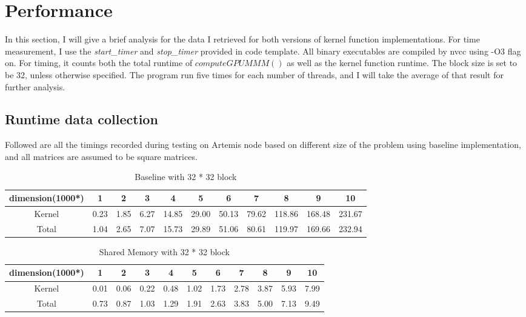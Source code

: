 \documentclass{cs4444}
\begin{document}
		\section{Performance}
	In this section, I will give a brief analysis for the data I retrieved for both versions of kernel function implementations.  For time measurement, I use the \textit{start\_timer} and \textit{stop\_timer} provided in code template. All binary executables are compiled by nvcc using -O3 flag on. For timing, it counts both the total runtime of $computeGPUMMM()$ as well as the kernel function runtime. The block size is set to be 32, unless otherwise specified.	
	 	The program run five times for each number of threads, and I will take the average of that result for further analysis.

\subsection{Runtime data collection}
	Followed are all the timings recorded during testing on Artemis node based on different size of the problem using baseline implementation, and all matrices are assumed to be square matrices. 
	
\begin{table}[ht]
\caption {Baseline with 32 * 32 block}
\centering
\begin{tabular}{c | c c c c c c c c c c}
\hline\hline
dimension(1000*) & 1 & 2 & 3 & 4 & 5 & 6 & 7 & 8 & 9 & 10 \\
\hline
 Kernel & 0.23 & 1.85 & 6.27 & 14.85 & 29.00 & 50.13 & 79.62 & 118.86 & 168.48 & 231.67\\
 Total  & 1.04 & 2.65 & 7.07 & 15.73 & 29.89 & 51.06 & 80.61 & 119.97 & 169.66 & 232.94\\
\end{tabular}
\centering
\end{table}

\begin{table}[ht]
\caption {Shared Memory with 32 * 32 block}
\centering
\begin{tabular}{c | c c c c c c c c c c}
\hline\hline
dimension(1000*) & 1 & 2 & 3 & 4 & 5 & 6 & 7 & 8 & 9 & 10 \\
\hline
 Kernel & 0.01 & 0.06 & 0.22 & 0.48 & 1.02 & 1.73 & 2.78 & 3.87 & 5.93 & 7.99\\
 Total  & 0.73 & 0.87 & 1.03 & 1.29 & 1.91 & 2.63 & 3.83 & 5.00 & 7.13 & 9.49\\
\end{tabular}
\centering
\end{table}
\end{document}
